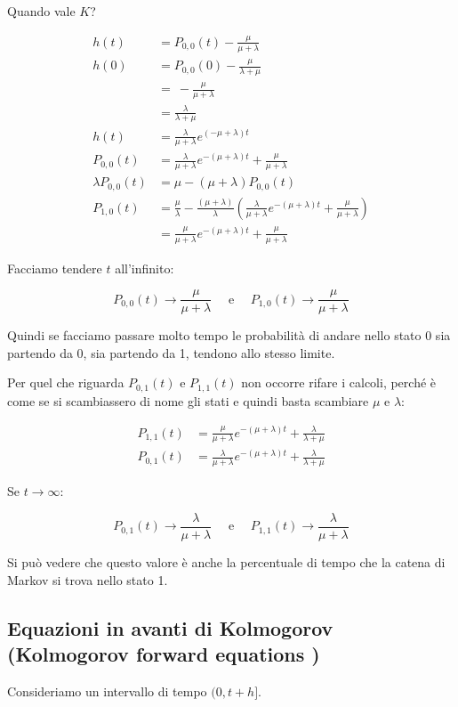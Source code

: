 \documentclass[a4paper,12pt]{book}
\begin{document}
Quando vale $ K $?

\begin{align*}
	h(t) & = P_{0,0}(t) - \frac{\mu}{\mu + \lambda} \\
	h(0) & = P_{0,0}(0) - \frac{\mu}{\lambda + \mu} \\
	& = \ - \frac{\mu}{\mu + \lambda} \\
	& = \frac{\lambda}{\lambda + \mu} \\
	h(t) & = \frac{\lambda}{\mu + \lambda}e^{(-\mu + \lambda)t} \\
	P_{0,0}(t) & = \frac{\lambda}{\mu + \lambda}e^{-(\mu + \lambda)t} + \frac{\mu}{\mu + \lambda} \\
	\lambda P_{0,0}(t) & = \mu - (\mu + \lambda) P_{0,0}(t) \\
	P_{1,0} (t) & = \frac{\mu}{\lambda} - \frac{(\mu + \lambda)}{\lambda} \left(\frac{\lambda}{\mu + \lambda} e^{-(\mu + \lambda)t} + \frac{\mu}{\mu + \lambda}\right) \\
	& = \frac{\mu}{\mu + \lambda}e^{-(\mu + \lambda)t} + \frac{\mu}{\mu + \lambda}
\end{align*}

Facciamo tendere $ t $ all'infinito:

$$ P_{0,0}(t) \to \frac{\mu}{\mu + \lambda} \quad \text{ e } \quad P_{1,0}(t) \to \frac{\mu}{\mu + \lambda}$$

Quindi se facciamo passare molto tempo le probabilità di andare nello stato 0 sia partendo da 0, sia partendo da 1, tendono allo stesso limite. 

Per quel che riguarda $ P_{0,1}(t) $ e $ P_{1,1}(t) $ non occorre rifare i calcoli, perché è come se si scambiassero di nome gli stati e quindi basta scambiare $\mu$ e $\lambda$:

\begin{align*}
	P_{1,1}(t) & = \frac{\mu}{\mu + \lambda} e^{-(\mu + \lambda)t} + \frac{\lambda}{\lambda + \mu} \\
	P_{0,1}(t) & = \frac{\lambda}{\mu + \lambda} e^{-(\mu + \lambda)t} + \frac{\lambda}{\lambda + \mu}
\end{align*}

Se $ t \to \infty $:

$$ P_{0,1}(t) \to \frac{\lambda}{\mu + \lambda} \quad \text{ e } \quad P_{1,1}(t) \to \frac{\lambda}{\mu + \lambda}$$

Si può vedere che questo valore è anche la percentuale di tempo che la catena di Markov si trova nello stato 1. %

\subsection{Equazioni in avanti di Kolmogorov (Kolmogorov forward equations )}
Consideriamo un intervallo di tempo $ (0, t+h] $. 
\end{document}
